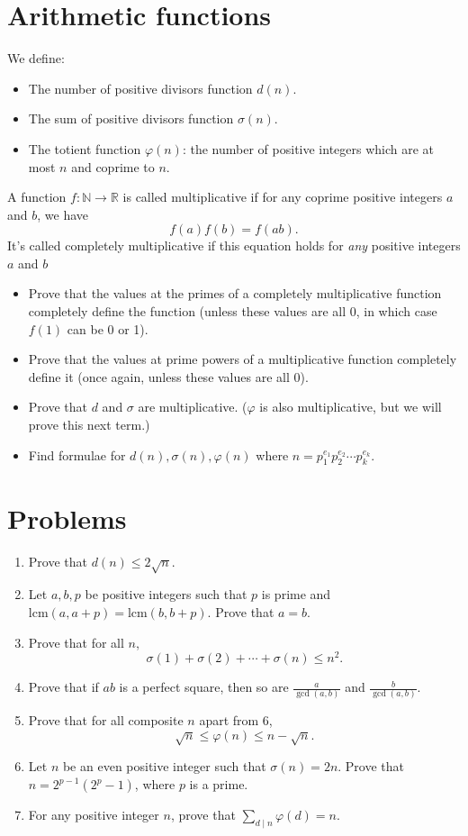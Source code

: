 \documentclass{article}
\newcommand\lcm{\text{lcm}}
\begin{document}
\section{Arithmetic functions}
  We define:
  \begin{itemize}
    \item The number of positive divisors function $d(n)$.
    \item The sum of positive divisors function $\sigma(n)$.
    \item The totient function $\varphi(n)$: the number of positive integers
      which are at most $n$ and coprime to $n$.
  \end{itemize}
  A function $f:\mathbb N\to\mathbb R$ is called multiplicative if for any
  coprime positive integers $a$ and $b$, we have
  \[f(a)f(b)=f(ab).\]
  It's called completely multiplicative if this equation holds for \emph{any}
  positive integers $a$ and $b$
  \begin{itemize}
    \item Prove that the values at the primes of a completely multiplicative
      function completely define the function (unless these values are all 0, in
      which case $f(1)$ can be 0 or 1).
    \item Prove that the values at prime powers of a multiplicative function
      completely define it (once again, unless these values are all 0).
    \item Prove that $d$ and $\sigma$ are multiplicative. ($\varphi$ is also
      multiplicative, but we will prove this next term.)
    \item
      Find formulae for $d(n),\sigma(n),\varphi(n)$ where
      $n=p_1^{e_1}p_2^{e_2}\cdots p_k^{e_k}$.
  \end{itemize}
\section{Problems}
\begin{enumerate}
  \item Prove that $d(n)\le 2\sqrt n$.
  \item Let $a,b,p$ be positive integers such that $p$ is prime and
    $\lcm(a,a+p)=\lcm(b,b+p)$. Prove that $a=b$.
  \item Prove that for all $n$,
    \[\sigma(1)+\sigma(2)+\cdots+\sigma(n)\le n^2.\]
  \item Prove that if $ab$ is a perfect square, then so are $\frac a{\gcd(a,b)}$ and
      $\frac b{\gcd(a,b)}$.
  \item Prove that for all composite $n$ apart from 6,
    \[\sqrt n\le\varphi(n)\le n-\sqrt n.\]
  \item Let $n$ be an even positive integer such that $\sigma(n)=2n$. Prove that
    $n=2^{p-1}\left(2^p-1\right)$, where $p$ is a prime.
  \item For any positive integer $n$, prove that $\displaystyle\sum_{d\mid
    n}\varphi(d)=n$.
\end{enumerate}
\newpage
\end{document}
